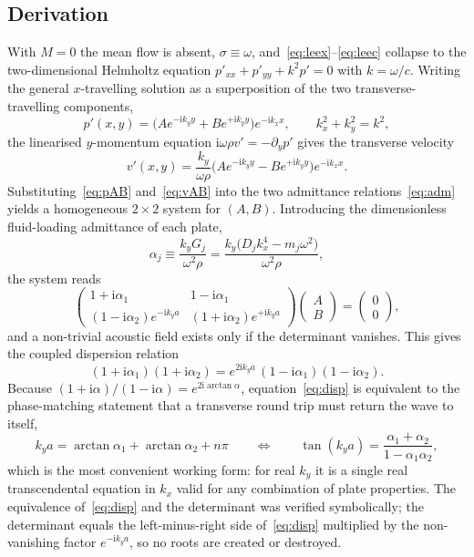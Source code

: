 \documentclass[11pt,a4paper]{article}
\newcommand{\ii}{\mathrm{i}}
\theoremstyle{plain}
\theoremstyle{remark}
\begin{document}
\subsection{Derivation}
With $M=0$ the mean flow is absent, $\sigma\equiv\omega$, and~\eqref{eq:leex}--\eqref{eq:leec} collapse
to the two-dimensional Helmholtz equation $p'_{xx}+p'_{yy}+k^2p'=0$ with $k=\omega/c$. Writing the
general $x$-travelling solution as a superposition of the two transverse-travelling components,
\begin{equation}
p'(x,y)=\bigl(Ae^{-\ii k_yy}+Be^{+\ii k_yy}\bigr)e^{-\ii k_xx},\qquad k_x^2+k_y^2=k^2,
\label{eq:pAB}
\end{equation}
the linearised $y$-momentum equation $\ii\omega\rho v'=-\partial_yp'$ gives the transverse velocity
\begin{equation}
v'(x,y)=\frac{k_y}{\omega\rho}\bigl(Ae^{-\ii k_yy}-Be^{+\ii k_yy}\bigr)e^{-\ii k_xx}.
\label{eq:vAB}
\end{equation}
Substituting~\eqref{eq:pAB} and~\eqref{eq:vAB} into the two admittance
relations~\eqref{eq:adm} yields a homogeneous $2\times2$ system for $(A,B)$. Introducing the
dimensionless fluid-loading admittance of each plate,
\begin{equation}
\alpha_j\equiv\frac{k_yG_j}{\omega^2\rho}=\frac{k_y\bigl(D_jk_x^4-m_j\omega^2\bigr)}{\omega^2\rho},
\label{eq:alphadef}
\end{equation}
the system reads
\begin{equation}
\begin{pmatrix}
1+\ii\alpha_1 & 1-\ii\alpha_1\\[2pt]
(1-\ii\alpha_2)e^{-\ii k_ya} & (1+\ii\alpha_2)e^{+\ii k_ya}
\end{pmatrix}
\begin{pmatrix}A\\B\end{pmatrix}=\begin{pmatrix}0\\0\end{pmatrix},
\end{equation}
and a non-trivial acoustic field exists only if the determinant vanishes. This gives the coupled
dispersion relation
\begin{equation}
\boxed{\;(1+\ii\alpha_1)(1+\ii\alpha_2)=e^{2\ii k_ya}\,(1-\ii\alpha_1)(1-\ii\alpha_2).\;}
\label{eq:disp}
\end{equation}
Because $(1+\ii\alpha)/(1-\ii\alpha)=e^{2\ii\arctan\alpha}$, equation~\eqref{eq:disp} is equivalent to
the phase-matching statement that a transverse round trip must return the wave to itself,
\begin{equation}
k_ya=\arctan\alpha_1+\arctan\alpha_2+n\pi
\qquad\Longleftrightarrow\qquad
\tan(k_ya)=\frac{\alpha_1+\alpha_2}{1-\alpha_1\alpha_2},
\label{eq:disptan}
\end{equation}
which is the most convenient working form: for real $k_y$ it is a single real transcendental equation
in $k_x$ valid for any combination of plate properties. The equivalence
of~\eqref{eq:disp} and the determinant was verified symbolically; the determinant equals the
left-minus-right side of~\eqref{eq:disp} multiplied by the non-vanishing factor $e^{-\ii k_ya}$, so no
roots are created or destroyed.
\end{document}
